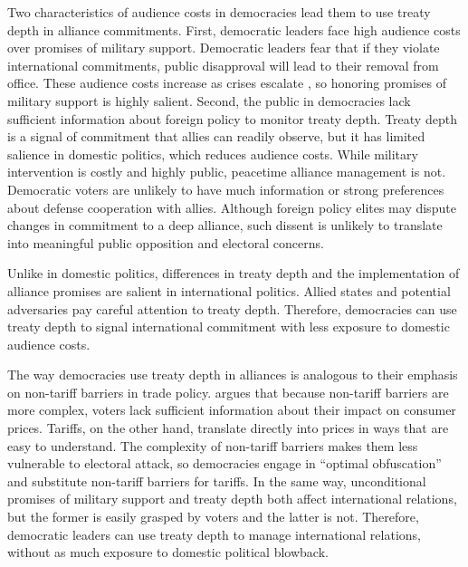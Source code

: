 \documentclass[12pt]{article}
\begin{document}
Two characteristics of audience costs in democracies lead them to use treaty depth in alliance commitments.  
First, democratic leaders face high audience costs over promises of military support.
Democratic leaders fear that if they violate international commitments, public disapproval will lead to their removal from office. 
These audience costs increase as crises escalate \citep{Tomz2007}, so honoring promises of military support is highly salient. 
Second, the public in democracies lack sufficient information about foreign policy to monitor treaty depth. 
Treaty depth is a signal of commitment that allies can readily observe, but it has limited salience in domestic politics, which reduces audience costs. 
While military intervention is costly and highly public, peacetime alliance management is not.  
Democratic voters are unlikely to have much information or strong preferences about defense cooperation with allies. 
Although foreign policy elites may dispute changes in commitment to a deep alliance, such dissent is unlikely to translate into meaningful public opposition and electoral concerns.


Unlike in domestic politics, differences in treaty depth and the implementation of alliance promises are salient in international politics. 
Allied states and potential adversaries pay careful attention to treaty depth. 
Therefore, democracies can use treaty depth to signal international commitment with less exposure to domestic audience costs. 


The way democracies use treaty depth in alliances is analogous to their emphasis on non-tariff barriers in trade policy.
\citet{Kono2006} argues that because non-tariff barriers are more complex, voters lack sufficient information about their impact on consumer prices.
Tariffs, on the other hand, translate directly into prices in ways that are easy to understand.
The complexity of non-tariff barriers makes them less vulnerable to electoral attack, so democracies engage in ``optimal obfuscation'' and substitute non-tariff barriers for tariffs. 
In the same way, unconditional promises of military support and treaty depth both affect international relations, but the former is easily grasped by voters and the latter is not. 
Therefore, democratic leaders can use treaty depth to manage international relations, without as much exposure to domestic political blowback.
\end{document}
